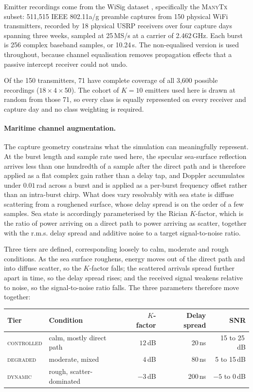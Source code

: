 \documentclass{article}
\begin{document}
Emitter recordings come from the WiSig dataset \citep{hanna2022}, specifically
the \textsc{ManyTx} subset: 511{,}515 IEEE 802.11a/g preamble captures from 150
physical WiFi transmitters, recorded by 18 physical USRP receivers over four
capture days spanning three weeks, sampled at 25\,MS/s at a carrier of
2.462\,GHz. Each burst is 256 complex baseband samples, or 10.24\,\textmu s. The
non-equalised version is used throughout, because channel equalisation removes
propagation effects that a passive intercept receiver could not undo.

Of the 150 transmitters, 71 have complete coverage of all 3{,}600 possible
recordings ($18 \times 4 \times 50$). The cohort of $K = 10$ emitters used here
is drawn at random from those 71, so every class is equally represented on every
receiver and capture day and no class weighting is required.

\paragraph{Maritime channel augmentation.}
The capture geometry constrains what the simulation can meaningfully represent.
At the burst length and sample rate used here, the specular sea-surface
reflection arrives less than one hundredth of a sample after the direct path and
is therefore applied as a flat complex gain rather than a delay tap, and Doppler
accumulates under $0.01$\,rad across a burst and is applied as a per-burst
frequency offset rather than an intra-burst chirp. What does vary resolvably
with sea state is diffuse scattering from a roughened surface, whose delay
spread is on the order of a few samples. Sea state is accordingly parameterised
by the Rician $K$-factor, which is the ratio of power arriving on a direct path
to power arriving as scatter, together with the r.m.s. delay spread and additive
noise to a target signal-to-noise ratio.

Three tiers are defined, corresponding loosely to calm, moderate and rough
conditions. As the sea surface roughens, energy moves out of the direct path and
into diffuse scatter, so the $K$-factor falls; the scattered arrivals spread
further apart in time, so the delay spread rises; and the received signal weakens
relative to noise, so the signal-to-noise ratio falls. The three parameters
therefore move together:

\begin{center}
\small
\begin{tabular}{llrrr}
\toprule
Tier & Condition & $K$-factor & Delay spread & SNR \\
\midrule
\textsc{controlled} & calm, mostly direct path & $12$\,dB & 20\,ns & 15 to 25\,dB \\
\textsc{degraded}   & moderate, mixed          & $4$\,dB  & 80\,ns & 5 to 15\,dB \\
\textsc{dynamic}    & rough, scatter-dominated & $-3$\,dB & 200\,ns & $-5$ to 0\,dB \\
\bottomrule
\end{tabular}
\end{center}
\end{document}

